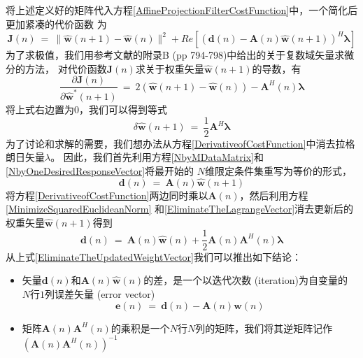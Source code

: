 将上述定义好的矩阵代入方程\eqref{AffineProjectionFilterCostFunction}中，一个简化后更加紧凑的代价函数
为
\begin{equation}%
    \mathbf{J}(n) ~=~ \|\hat{\mathbf{w}}(n+1)-\hat{\mathbf{w}}(n)\|^{2} +
    Re[(\mathbf{d}(n)-\mathbf{A}(n)\hat{\mathbf{w}}(n+1))^{H}\boldsymbol{\lambda}]
\end{equation}
为了求极值，我们用参考文献的附录B (pp 794-798)中给出的关于复数域矢量求微分的方法，
对代价函数$\mathbf{J}(n)$求关于权重矢量$\hat{\mathbf{w}}(n+1)$的导数，有
\begin{equation}%
    \frac{\partial\mathbf{J}(n)}{\partial\hat{\mathbf{w}}^{*}(n+1)} ~=~
    2(\hat{\mathbf{w}}(n+1)-\hat{\mathbf{w}}(n)) - \mathbf{A}^{H}(n)\boldsymbol{\lambda}
\end{equation}
将上式右边置为$0$，我们可以得到等式
\begin{equation}\label{DerivativeofCostFunction}
    \delta\hat{\mathbf{w}}(n+1) ~=~ \frac{1}{2}\mathbf{A}^{H}\boldsymbol{\lambda}
\end{equation}
为了讨论和求解的需要，我们想办法从方程\eqref{DerivativeofCostFunction}中消去拉格朗日矢量$\lambda$。
因此，我们首先利用方程\eqref{NbyMDataMatrix}和\eqref{NbyOneDesiredResponseVector}将最开始的
$N$维限定条件集重写为等价的形式，
\begin{equation} \label{EliminateTheLagrangeVector}
    \mathbf{d}(n) ~=~ \mathbf{A}(n)\hat{\mathbf{w}}(n+1)
\end{equation}
将方程\eqref{DerivativeofCostFunction}两边同时乘以$\mathbf{A}(n)$，然后利用方程\eqref{MinimizeSquaredEuclideanNorm}
和\eqref{EliminateTheLagrangeVector}消去更新后的权重矢量$\hat{\mathbf{w}}(n+1)$得到
\begin{equation}\label{EliminateTheUpdatedWeightVector}
    \mathbf{d}(n) ~=~ \mathbf{A}(n)\hat{\mathbf{w}}(n) + \frac{1}{2}\mathbf{A}(n)\mathbf{A}^{H}(n)\boldsymbol{\lambda}
\end{equation}
从上式\eqref{EliminateTheUpdatedWeightVector}我们可以推出如下结论：
\begin{itemize}
  \item 矢量$\mathbf{d}(n)$和$\mathbf{A}(n)\hat{\mathbf{w}}(n)$的差，是一个以迭代次数 (iteration)为自变量的
  $N$行$1$列误差矢量 (error vector)
  \begin{equation} \label{NbyOneErrorVector}
    \mathbf{e}(n) ~=~ \mathbf{d}(n)-\mathbf{A}(n)\hat{\mathbf{w}}(n)
  \end{equation}

  \item 矩阵$\mathbf{A}(n)\mathbf{A}^{H}(n)$的乘积是一个$N$行$N$列的矩阵，我们将其逆矩阵记作
  $(\mathbf{A}(n)\mathbf{A}^{H}(n))^{-1}$
\end{itemize}
